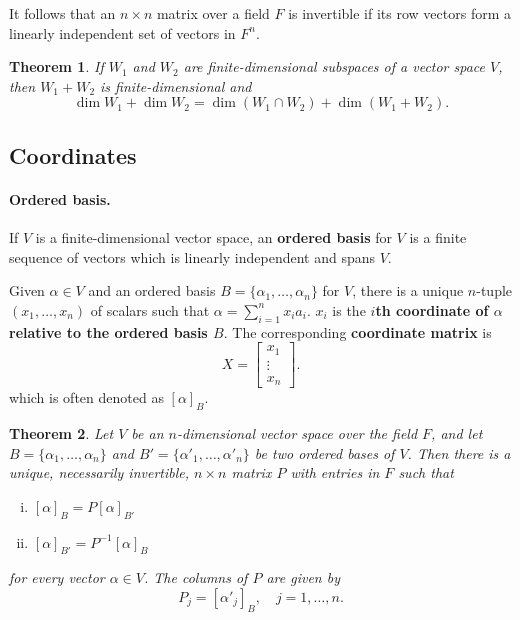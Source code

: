 \documentclass{article}
\newtheorem{theorem}{Theorem}[section]
\begin{document}
It follows that an $n \times n$ matrix over a field $F$ is invertible if its row
vectors form a linearly independent set of vectors in $F^n$.

\begin{theorem}
  If $W_1$ and $W_2$ are finite-dimensional subspaces of a vector space $V$,
  then $W_1 + W_2$ is finite-dimensional and \[
    \dim W_1 + \dim W_2 = \dim (W_1 \cap W_2) + \dim (W_1 + W_2).
  \]
\end{theorem}

\subsection{Coordinates}

\paragraph{Ordered basis.} If $V$ is a finite-dimensional vector space, an
\textbf{ordered basis} for $V$ is a finite sequence of vectors which is linearly
independent and spans $V$.

Given $\alpha \in V$ and an ordered basis $B = \{\alpha_1, \ldots, \alpha_n\}$
for $V$, there is a unique $n$-tuple $(x_1, \ldots, x_n)$ of scalars such that
$\alpha = \sum_{i=1}^n x_ia_i$. $x_i$ is the \textbf{$i$th coordinate of
$\alpha$ relative to the ordered basis $B$}. The corresponding
\textbf{coordinate matrix} is \[
  X = \begin{bmatrix}
    x_1 \\
    \vdots \\
    x_n
  \end{bmatrix}.
\] which is often denoted as $[\alpha]_B$.

\begin{theorem}
  Let $V$ be an $n$-dimensional vector space over the field $F$, and let $B = \{
  \alpha_1, \ldots, \alpha_n\}$ and $B' = \{\alpha'_1, \ldots, \alpha'_n\}$ be
  two ordered bases of $V$. Then there is a unique, necessarily invertible, $n
  \times n$ matrix $P$ with entries in $F$ such that
  \begin{enumerate}[(i)]
    \item $[\alpha]_B = P[\alpha]_{B'}$
    \item $[\alpha]_{B'} = P^{-1}[\alpha]_B$
  \end{enumerate}
  for every vector $\alpha \in V$. The columns of $P$ are given by \[
    P_j = [\alpha'_j]_B,\quad j = 1, \ldots, n.
  \]
\end{theorem}
\end{document}
